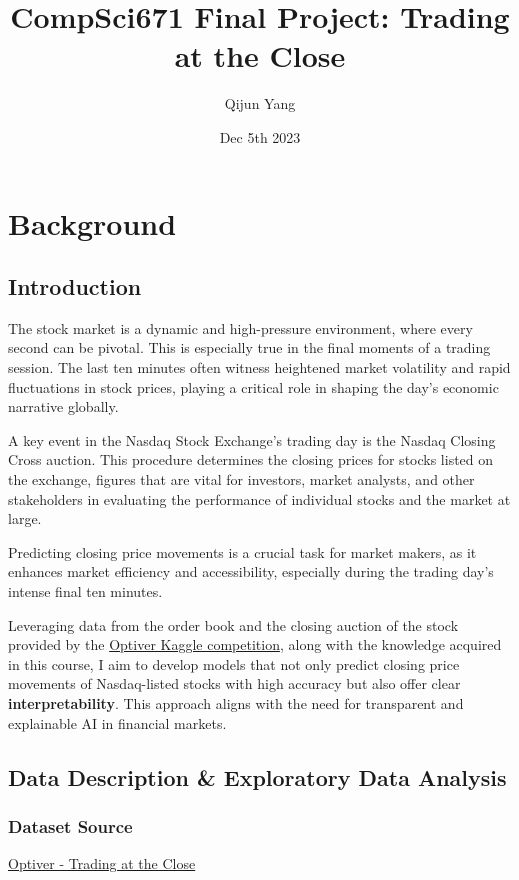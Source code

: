 \documentclass[12pt]{article}
\title{CompSci671 Final Project: Trading at the Close \\}
\author{Qijun Yang}
\date{ Dec 5th 2023\\}
\newtheorem{Proof of Lemma}{Proof of Lemma}
\begin{document}
\maketitle


\section{Background}
\subsection{Introduction}

The stock market is a dynamic and high-pressure environment, where every second can be pivotal. This is especially true in the final moments of a trading session. The last ten minutes often witness heightened market volatility and rapid fluctuations in stock prices, playing a critical role in shaping the day's economic narrative globally.

A key event in the Nasdaq Stock Exchange's trading day is the Nasdaq Closing Cross auction. This procedure determines the closing prices for stocks listed on the exchange, figures that are vital for investors, market analysts, and other stakeholders in evaluating the performance of individual stocks and the market at large.

Predicting closing price movements is a crucial task for market makers, as it enhances market efficiency and accessibility, especially during the trading day's intense final ten minutes.

Leveraging data from the order book and the closing auction of the stock provided by the \href{https://www.kaggle.com/competitions/optiver-trading-at-the-close/overview}{Optiver Kaggle competition}, along with the knowledge acquired in this course, I aim to develop models that not only predict closing price movements of Nasdaq-listed stocks with high accuracy but also offer clear \textbf{interpretability}. This approach aligns with the need for transparent and explainable AI in financial markets.



\subsection{Data Description \& Exploratory Data Analysis}

\subsubsection*{Dataset Source} \href{https://www.kaggle.com/competitions/optiver-trading-at-the-close/data}{Optiver - Trading at the Close}
\end{document}
